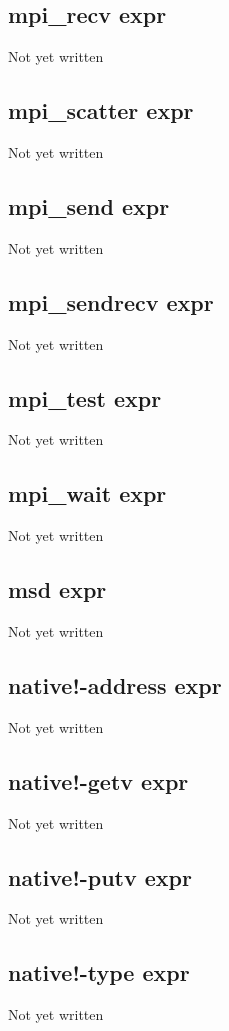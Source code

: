 \documentclass[a4paper,11pt]{article}
\begin{document}
{\subsection{\ttfamily mpi\_recv expr}
Not yet written

\subsection{\ttfamily mpi\_scatter expr}
Not yet written

\subsection{\ttfamily mpi\_send expr}
Not yet written

\subsection{\ttfamily mpi\_sendrecv expr}
Not yet written

\subsection{\ttfamily mpi\_test expr}
Not yet written

\subsection{\ttfamily mpi\_wait expr}
Not yet written

\subsection{\ttfamily msd expr}
Not yet written

\subsection{\ttfamily native!-address expr}
Not yet written

\subsection{\ttfamily native!-getv expr}
Not yet written

\subsection{\ttfamily native!-putv expr}
Not yet written

\subsection{\ttfamily native!-type expr}
Not yet written

}
\end{document}
